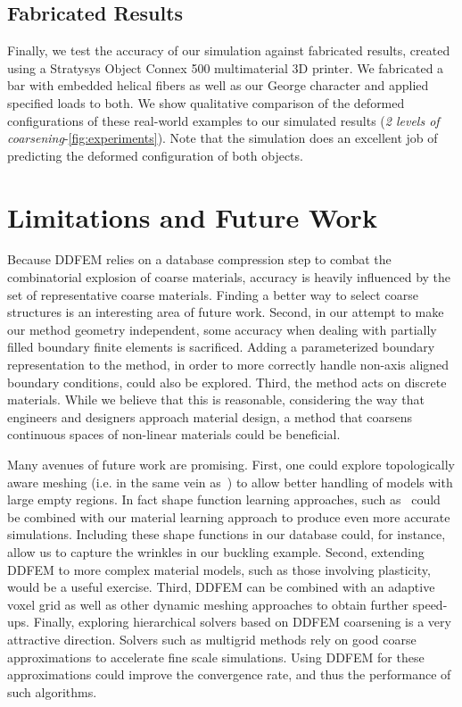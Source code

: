 \subsection{Fabricated Results}
Finally, we test the accuracy of our simulation against fabricated results, created using a Stratysys Object Connex 500 multimaterial 3D printer. We fabricated a bar with embedded helical fibers as well as our George character and applied specified loads to both. We show qualitative comparison of the deformed configurations of these real-world examples to our simulated results (\emph{2 levels of coarsening}-\autoref{fig:experiments}). Note that the simulation does an excellent job of predicting the deformed configuration of both objects.

\section{Limitations and Future Work}
Because DDFEM relies on a database compression step to combat the combinatorial explosion of coarse materials,  accuracy is heavily influenced by the set of representative coarse materials. Finding a better way to select coarse structures is an interesting area of future work.
Second, in our attempt to make our method geometry independent, some accuracy when dealing with partially filled boundary finite elements is sacrificed. Adding a parameterized boundary representation to the method, in order to more correctly handle non-axis aligned boundary conditions, could also be explored. Third, the method acts on discrete materials. While we believe that this is reasonable, considering the way that engineers and designers approach material design, a method that coarsens continuous spaces of non-linear materials could be beneficial.   

Many avenues of future work are promising. First, one could explore topologically aware meshing (i.e. in the same vein as~\citet{Nesme2009}) to allow better handling of models with large empty regions.
In fact shape function learning approaches, such as~\citet{Nesme2009} could be combined with our material learning approach to produce even more accurate simulations. Including these shape functions in our database could, for instance,  allow us to capture the wrinkles in our buckling example. Second, extending DDFEM to more complex material models, such as those involving plasticity, would be a useful exercise.
Third, DDFEM can be combined with an adaptive voxel grid as well as other dynamic meshing approaches to obtain further speed-ups.  Finally,  exploring hierarchical solvers based on DDFEM coarsening is a very attractive direction. Solvers such as multigrid methods rely on good coarse approximations to accelerate fine scale simulations. Using DDFEM for these approximations could improve the convergence rate, and thus the performance of such algorithms. 
